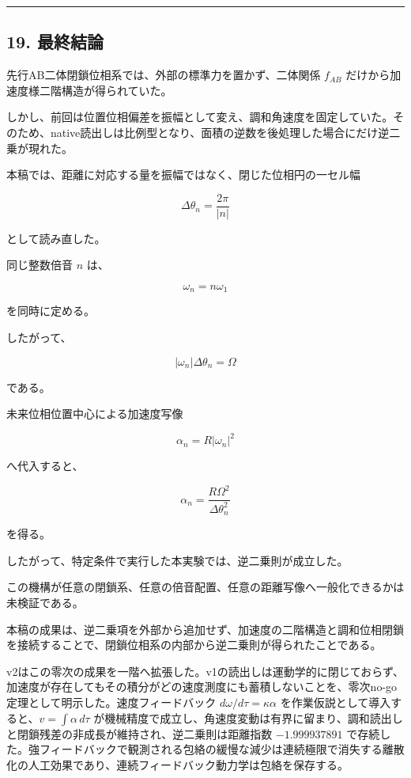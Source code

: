 \documentclass[
  a4paper,
]{ltjsarticle}
\begin{document}
\begin{center}\rule{0.5\linewidth}{0.5pt}\end{center}

\subsection{19. 最終結論}\label{ux6700ux7d42ux7d50ux8ad6}

先行AB二体閉鎖位相系では、外部の標準力を置かず、二体関係 \(f_{AB}\)
だけから加速度様二階構造が得られていた。

しかし、前回は位置位相偏差を振幅として変え、調和角速度を固定していた。そのため、native読出しは比例型となり、面積の逆数を後処理した場合にだけ逆二乗が現れた。

本稿では、距離に対応する量を振幅ではなく、閉じた位相円の一セル幅

\[
\Delta\theta_n=\frac{2\pi}{|n|}
\]

として読み直した。

同じ整数倍音 \(n\) は、

\[
\omega_n=n\omega_1
\]

を同時に定める。

したがって、

\[
|\omega_n|\Delta\theta_n=\Omega
\]

である。

未来位相位置中心による加速度写像

\[
\alpha_n=R|\omega_n|^2
\]

へ代入すると、

\[
\boxed{
\alpha_n
=\frac{R\Omega^2}{\Delta\theta_n^2}
}
\]

を得る。

したがって、特定条件で実行した本実験では、逆二乗則が成立した。

この機構が任意の閉鎖系、任意の倍音配置、任意の距離写像へ一般化できるかは未検証である。

本稿の成果は、逆二乗項を外部から追加せず、加速度の二階構造と調和位相閉鎖を接続することで、閉鎖位相系の内部から逆二乗則が得られたことである。

v2はこの零次の成果を一階へ拡張した。v1の読出しは運動学的に閉じておらず、加速度が存在してもその積分がどの速度測度にも蓄積しないことを、零次no-go定理として明示した。速度フィードバック
\(d\omega/d\tau=\kappa\alpha\)
を作業仮説として導入すると、\(v=\int\alpha\,d\tau\)
が機械精度で成立し、角速度変動は有界に留まり、調和読出しと閉鎖残差の非成長が維持され、逆二乗則は距離指数
\(-1.999937891\)
で存続した。強フィードバックで観測される包絡の緩慢な減少は連続極限で消失する離散化の人工効果であり、連続フィードバック動力学は包絡を保存する。
\end{document}
